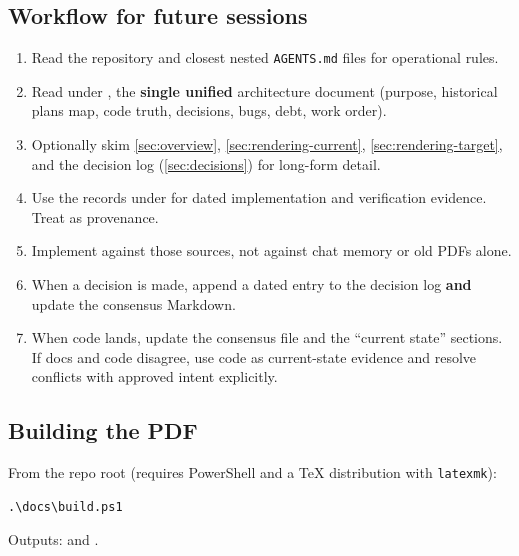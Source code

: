 \subsection{Workflow for future sessions}
\begin{enumerate}
  \item Read the repository and closest nested \texttt{AGENTS.md} files for
        operational rules.
  \item Read  under , the \textbf{single
        unified} architecture document (purpose, historical plans map, code
        truth, decisions, bugs, debt, work order).
  \item Optionally skim \cref{sec:overview}, \cref{sec:rendering-current},
        \cref{sec:rendering-target}, and the decision log
        (\cref{sec:decisions}) for long-form detail.
  \item Use the records under  for dated implementation
        and verification evidence. Treat  as provenance.
  \item Implement against those sources, not against chat memory or old PDFs alone.
  \item When a decision is made, append a dated entry to the decision log
        \textbf{and} update the consensus Markdown.
  \item When code lands, update the consensus file and the ``current state''
        sections. If docs and code disagree, use code as current-state evidence
        and resolve conflicts with approved intent explicitly.
\end{enumerate}

\subsection{Building the PDF}
From the repo root (requires PowerShell and a TeX distribution with
\texttt{latexmk}):
\begin{lstlisting}[language={}]
.\docs\build.ps1
\end{lstlisting}

\noindent Outputs:  and
.

